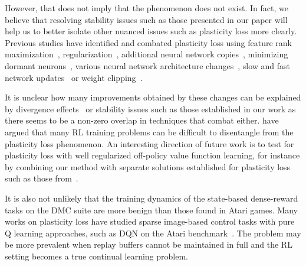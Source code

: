However, that does not imply that the phenomenon does not exist. In fact, we believe that resolving stability issues such as those presented in our paper will help us to better isolate other nuanced issues such as plasticity loss more clearly.
Previous studies have identified and combated plasticity loss using feature rank maximization~\textcite{kumar2021implicit}, regularization~\textcite{lyle2023understanding}, additional neural network copies~\textcite{nikishin2024deep}, minimizing dormant neurons~\textcite{sokar2023dormant, xu2024drm}, various neural network architecture changes~\textcite{lee2023plastic}, slow and fast network updates~\textcite{lee2024slow} or weight clipping~\textcite{elsayed2024weightclipping}. 

It is unclear how many improvements obtained by these changes can be explained by divergence effects~\textcite{hussing2024dissecting} or stability issues such as those established in our work as there seems to be a non-zero overlap in techniques that combat either. 
\textcite{nauman2024overestimation} have argued that many RL training problems can be difficult to disentangle from the plasticity loss phenomenon.
An interesting direction of future work is to test for plasticity loss with well regularized off-policy value function learning, for instance by combining our method with separate solutions established for plasticity loss such as those from~\textcite{lyle2024disentangling}. 

It is also not unlikely that the training dynamics of the state-based dense-reward tasks on the DMC suite are more benign than those found in Atari games. 
Many works on plasticity loss have studied sparse image-based control tasks with pure Q learning approaches, such as DQN on the Atari benchmark~\textcite{sokar2023dormant, lee2024slow}. 
The problem may be more prevalent when replay buffers cannot be maintained in full and the RL setting becomes a true continual learning problem.

